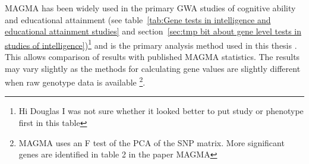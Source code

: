 


MAGMA has been widely used in the primary GWA studies of cognitive ability and educational attainment (see table~\ref{tab:Gene tests in intelligence and educational attainment studies} and section~\ref{sec:tmp bit about gene level tests in studies of intelligence})\footnote{Hi Douglas I was not sure whether it looked better to put study or phenotype first in this table} and is the primary analysis method used in this thesis . This allows comparison of results with published MAGMA statistics. The results may vary slightly as the methods for calculating gene values are slightly different when raw genotype data is available \footnote{MAGMA uses an F test of the PCA of the SNP matrix. More significant genes are identified in table 2 in the paper MAGMA}. 





